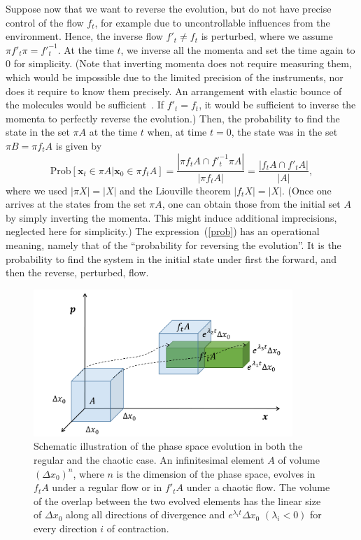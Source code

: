 \documentclass[12pt,a4]{article}
\begin{document}
Suppose now that we want to reverse the evolution, but do not have precise control of the flow $f_t$, for example due to uncontrollable influences from the environment. Hence, the inverse flow $f'_t \neq f_t$ is perturbed, where we assume $\pi f'_t \pi =f'^{-1}_t$.
At the time $t$, we inverse all the momenta and set the time again to 0 for simplicity. (Note that inverting momenta does not require measuring them, which would be impossible due to the limited precision of the instruments, nor does it require to know them precisely. An arrangement with elastic bounce of the molecules would be sufficient~\cite{peres2}. If $f'_t=f_t$, it would be sufficient to inverse the momenta to perfectly reverse the evolution.) Then, the probability to find the state in the set $\pi A$ at the time $t$ when, at time $t=0$, the state was in the set $\pi B= \pi f_tA$ is given by
\begin{equation}
\mbox{Prob}[\mathbf{x}_t \in \pi A| \mathbf{x}_0 \in \pi f_t A] = \frac{|\pi f_t A \cap f'^{-1}_t \pi A|}{|\pi f_t A|} = \frac{|f_t A \cap f'_t A|}{|A|},\label{prob}
\end{equation}
where we used $|\pi X|=|X|$ and the Liouville theorem $|f_t X|=|X|$. (Once one arrives at the states from the set $\pi A$, one can obtain those from the initial set $A$ by simply inverting the momenta. This might induce additional imprecisions, neglected here for simplicity.) The expression~(\ref{prob}) has an operational meaning, namely that of the ``probability for reversing the evolution''. It is the probability to find the system in the initial state under first the forward, and then the reverse, perturbed, flow.

\begin{figure}
\begin{center}
\includegraphics[width=9.8cm]{Slika.png}
\end{center}
\caption{Schematic illustration of the phase space evolution in both the regular and the chaotic case. An infinitesimal element $A$ of volume $(\Delta x_0)^n$, where $n$ is the dimension of the phase space, evolves in $f_tA$ under a regular flow or in $f'_tA$ under a chaotic flow. The volume of the overlap between the two evolved elements has the linear size of $\Delta x_0$ along all directions of divergence and $e^{\lambda_i t} \Delta x_0$ $(\lambda_i <0)$ for every direction $i$ of contraction.} \label{figure1}
\end{figure}
\end{document}

